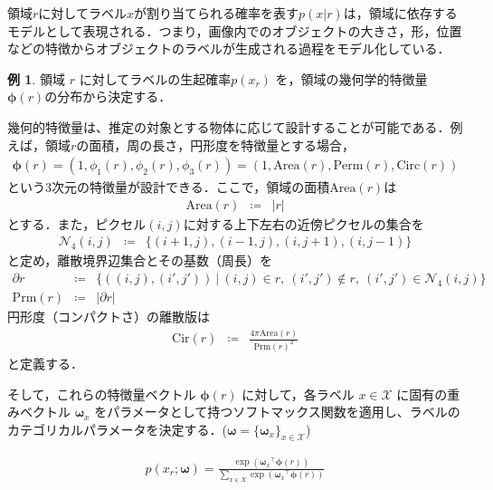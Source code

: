 \documentclass{jsarticle}
\theoremstyle{definition}
\newtheorem{example}{例}
\begin{document}
領域$r$に対してラベル$x$が割り当てられる確率を表す$p(x|r)$は，領域に依存するモデルとして表現される．つまり，画像内でのオブジェクトの大きさ，形，位置などの特徴からオブジェクトのラベルが生成される過程をモデル化している．

\begin{example}
    領域 $r$ に対してラベルの生起確率$p(x_r)$ を，領域の幾何学的特徴量$\bm{\phi}(r)$の分布から決定する．
    
幾何的特徴量は、推定の対象とする物体に応じて設計することが可能である．例えば，領域$r$の面積，周の長さ，円形度を特徴量とする場合，
\begin{eqnarray}
  \bm{\phi}(r) = (1, \phi_1(r), \phi_2(r), \phi_3(r)) = (1, \text{Area}(r), \text{Perm}(r), \text{Circ}(r))
\end{eqnarray}
という3次元の特徴量が設計できる．ここで，領域の面積$\text{Area}(r)$は
\begin{eqnarray}
\mathrm{Area}(r) &\coloneqq& |r|
\end{eqnarray}
とする．また，ピクセル$(i,j)$に対する上下左右の近傍ピクセルの集合を
\begin{eqnarray}
\mathcal{N}_4(i,j) &\coloneqq& \{(i+1,j),(i-1,j),(i,j+1),(i,j-1)\}
\end{eqnarray}
と定め，離散境界辺集合とその基数（周長）を
\begin{eqnarray}
\partial r &\coloneqq& \{((i,j),(i',j'))\ \big|\ (i,j)\in r,\ (i',j')\notin r,\ (i',j')\in \mathcal{N}_4(i,j)\}\\
\mathrm{Prm}(r) &\coloneqq& |\partial r|
\end{eqnarray}
円形度（コンパクトさ）の離散版は
\begin{eqnarray}
\mathrm{Cir}(r) &\coloneqq& \frac{4\pi \mathrm{Area}(r)}{\mathrm{Prm}(r)^2}
\end{eqnarray}
と定義する．

そして，これらの特徴量ベクトル $\bm{\phi}(r)$ に対して，各ラベル $x \in \mathcal{X}$ に固有の重みベクトル $\bm{\omega}_x$ をパラメータとして持つソフトマックス関数を適用し、ラベルのカテゴリカルパラメータを決定する．($\bm{\omega} = \{\bm{\omega}_x\}_{x\in \mathcal{X}}$)

\begin{eqnarray}
  p(x_r;\bm{\omega}) =\frac{\exp \left( {\bm{\omega}_{x}}^{\top} \bm{\phi}(r) \right)}{\sum_{x\in X} \exp \left( {\bm{\omega}_{x}}^{\top} \bm{\phi}(r) \right)}
\end{eqnarray}

\end{example}
\end{document}
